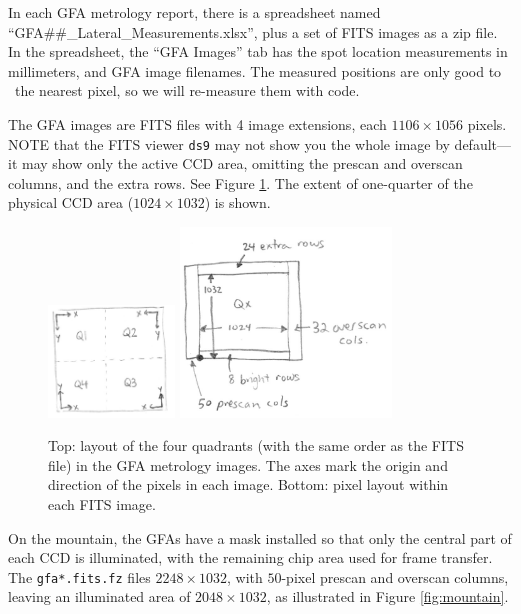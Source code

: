 \documentclass[10pt]{article}
\newcommand{\code}[1]{\texttt{#1}}
\begin{document}
In each GFA metrology report, there is a spreadsheet named
``GFA\#\#\_Lateral\_Measurements.xlsx'', plus a set of FITS images as a
zip file.  In the spreadsheet, the ``GFA Images'' tab has the spot
location measurements in millimeters, and GFA image filenames.  The
measured positions are only good to ~the nearest pixel, so we will
re-measure them with code.

The GFA images are FITS files with 4 image extensions, each $1106
\times 1056$ pixels.  NOTE that the FITS viewer \code{ds9} may not
show you the whole image by default---it may show only the active CCD
area, omitting the prescan and overscan columns, and the extra rows.
See Figure \ref{fig:metrologya}.  The extent of one-quarter of
the physical CCD area ($1024 \times 1032$) is shown.

\begin{figure}[h!]
  \begin{center}
    \includegraphics[width=0.3\textwidth]{gfa-metrology1a.jpeg}
    \includegraphics[width=0.5\textwidth]{gfa-metrology1b.jpeg}
  \end{center}
  \caption{\label{fig:metrologya}Top: layout of the four quadrants
    (with the same order as the FITS file) in the GFA metrology
    images.  The axes mark the origin and direction of the pixels in
    each image.  Bottom: pixel layout within each FITS image.}
\end{figure}

On the mountain, the GFAs have a mask installed so that only the
central part of each CCD is illuminated, with the remaining chip area
used for frame transfer.  The \code{gfa*.fits.fz} files $2248 \times
1032$, with $50$-pixel prescan and overscan columns, leaving an
illuminated area of $2048 \times 1032$, as illustrated in Figure
\ref{fig:mountain}.
\end{document}

